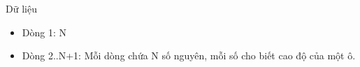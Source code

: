 Dữ liệu
\begin{itemize}
	\item     Dòng 1: N   
	\item     Dòng 2..N+1: Mỗi dòng chứa N số nguyên, mỗi số cho biết cao độ của một ô.   
\end{itemize}